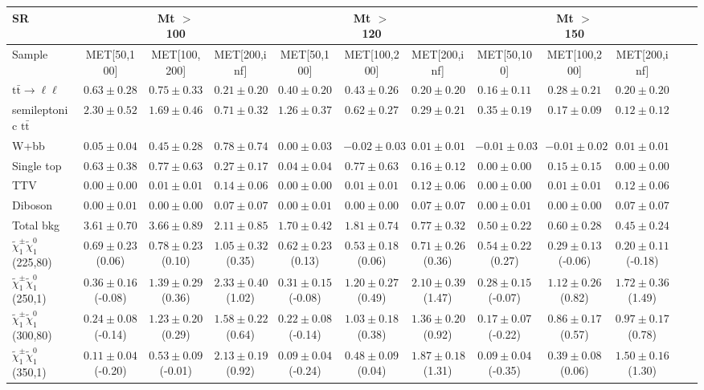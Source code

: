 \begin{table}
\begin{center}
\small
\begin{tabular}{lccccccccccc}
\hline
SR & & Mt $>$ 100 & & & Mt $>$ 120 & & &Mt $>$ 150 & & &\\
\hline
Sample&MET[50,100]&MET[100,200]&MET[200,inf]&MET[50,100]&MET[100,200]&MET[200,inf]&MET[50,100]&MET[100,200]&MET[200,inf]&\\
\hline
$\mathrm{t}\bar{\mathrm{t}}\rightarrow \ell\ell$&$0.63\pm0.28$&$0.75\pm0.33$&$0.21\pm0.20$&$0.40\pm0.20$&$0.43\pm0.26$&$0.20\pm0.20$&$0.16\pm0.11$&$0.28\pm0.21$&$0.20\pm0.20$\\
semileptonic $\mathrm{t}\bar{\mathrm{t}}$&$2.30\pm0.52$&$1.69\pm0.46$&$0.71\pm0.32$&$1.26\pm0.37$&$0.62\pm0.27$&$0.29\pm0.21$&$0.35\pm0.19$&$0.17\pm0.09$&$0.12\pm0.12$\\
W+bb&$0.05\pm0.04$&$0.45\pm0.28$&$0.78\pm0.74$&$0.00\pm0.03$&$-0.02\pm0.03$&$0.01\pm0.01$&$-0.01\pm0.03$&$-0.01\pm0.02$&$0.01\pm0.01$\\
Single top&$0.63\pm0.38$&$0.77\pm0.63$&$0.27\pm0.17$&$0.04\pm0.04$&$0.77\pm0.63$&$0.16\pm0.12$&$0.00\pm0.00$&$0.15\pm0.15$&$0.00\pm0.00$\\
TTV&$0.00\pm0.00$&$0.01\pm0.01$&$0.14\pm0.06$&$0.00\pm0.00$&$0.01\pm0.01$&$0.12\pm0.06$&$0.00\pm0.00$&$0.01\pm0.01$&$0.12\pm0.06$\\
Diboson&$0.00\pm0.01$&$0.00\pm0.00$&$0.07\pm0.07$&$0.00\pm0.01$&$0.00\pm0.00$&$0.07\pm0.07$&$0.00\pm0.01$&$0.00\pm0.00$&$0.07\pm0.07$\\
\hline
Total bkg&$3.61\pm0.70$&$3.66\pm0.89$&$2.11\pm0.85$&$1.70\pm0.42$&$1.81\pm0.74$&$0.77\pm0.32$&$0.50\pm0.22$&$0.60\pm0.28$&$0.45\pm0.24$\\
$\tilde{\chi}_{1}^{\pm}\tilde{\chi}_{1}^{0}$ (225,80)&$0.69\pm0.23$(0.06)&$0.78\pm0.23$(0.10)&$1.05\pm0.32$(0.35)&$0.62\pm0.23$(0.13)&$0.53\pm0.18$(0.06)&$0.71\pm0.26$(0.36)&$0.54\pm0.22$(0.27)&$0.29\pm0.13$(-0.06)&$0.20\pm0.11$(-0.18)\\
$\tilde{\chi}_{1}^{\pm}\tilde{\chi}_{1}^{0}$ (250,1)&$0.36\pm0.16$(-0.08)&$1.39\pm0.29$(0.36)&$2.33\pm0.40$(1.02)&$0.31\pm0.15$(-0.08)&$1.20\pm0.27$(0.49)&$2.10\pm0.39$(1.47)&$0.28\pm0.15$(-0.07)&$1.12\pm0.26$(0.82)&$1.72\pm0.36$(1.49)\\
$\tilde{\chi}_{1}^{\pm}\tilde{\chi}_{1}^{0}$ (300,80)&$0.24\pm0.08$(-0.14)&$1.23\pm0.20$(0.29)&$1.58\pm0.22$(0.64)&$0.22\pm0.08$(-0.14)&$1.03\pm0.18$(0.38)&$1.36\pm0.20$(0.92)&$0.17\pm0.07$(-0.22)&$0.86\pm0.17$(0.57)&$0.97\pm0.17$(0.78)\\
$\tilde{\chi}_{1}^{\pm}\tilde{\chi}_{1}^{0}$ (350,1)&$0.11\pm0.04$(-0.20)&$0.53\pm0.09$(-0.01)&$2.13\pm0.19$(0.92)&$0.09\pm0.04$(-0.24)&$0.48\pm0.09$(0.04)&$1.87\pm0.18$(1.31)&$0.09\pm0.04$(-0.35)&$0.39\pm0.08$(0.06)&$1.50\pm0.16$(1.30)\\
\hline
\hline\hline
\end{tabular}
\end{center}
\end{table}
